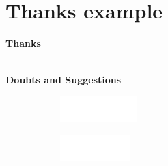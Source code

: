 \documentclass[aspectratio=169,t,xcolor=table]{beamer}
\begin{document}
\section{Thanks example}
\begin{frame}
    
    \centering
    \vspace{2cm}
    
    \textbf{\Huge Thanks}
    
    \ \\
    
    \textbf{Doubts and Suggestions}
    \ \\
    
    
    \vspace{2cm}
    \begin{figure}
        \centering
        \begin{subfigure}{0.2\textwidth}
            \centering
            \includegraphics[height=1cm]{lib/logos/infw.png}
        \end{subfigure}%
        \qquad 
        \begin{subfigure}{0.2\textwidth}
            \centering
            \includegraphics[height=1cm]{lib/logos/ufgw.png}
        \end{subfigure}
      
    \end{figure}
    
\end{frame}

\titlepage
\end{document}
